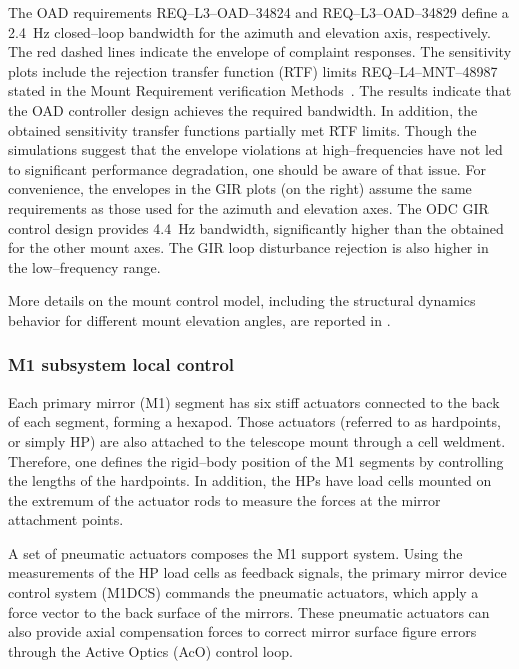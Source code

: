 \documentclass{gmto}
\begin{document}
The OAD requirements REQ--L3--OAD--34824 and REQ--L3--OAD--34829 define a \SI{2.4}{Hz} closed--loop bandwidth for the azimuth and elevation axis, respectively. The red dashed lines indicate the envelope of complaint responses. The sensitivity plots include the rejection transfer function (RTF) limits REQ--L4--MNT--48987 stated in the Mount Requirement verification Methods~\cite[Section 5.6.1]{GMT.DOC.02011}. The results indicate that the OAD controller design achieves the required bandwidth. In addition, the obtained sensitivity transfer functions partially met RTF limits. Though the simulations suggest that the envelope violations at high--frequencies have not led to significant performance degradation, one should be aware of that issue. For convenience, the envelopes in the GIR plots (on the right) assume the same requirements as those used for the azimuth and elevation axes. The ODC GIR control design provides \SI{4.4}{Hz} bandwidth, significantly higher than the obtained for the other mount axes. The GIR loop disturbance rejection is also higher in the low--frequency range.

More details on the mount control model, including the structural dynamics behavior for different mount elevation angles, are reported in \cite[Section 3]{ODC_end2end_2021}.


\subsubsection{M1 subsystem local control}
\label{sec:m1-ctrl}

Each primary mirror (M1) segment has six stiff actuators connected to the back of each segment, forming a hexapod. Those actuators (referred to as hardpoints, or simply HP) are also attached to the telescope mount through a cell weldment. Therefore, one defines the rigid--body position of the M1 segments by controlling the lengths of the hardpoints. In addition, the HPs have load cells mounted on the extremum of the actuator rods to measure the forces at the mirror attachment points.


A set of pneumatic actuators composes the M1 support system. Using the measurements of the HP load cells as feedback signals, the primary mirror device control system (M1DCS) commands the pneumatic actuators, which apply a force vector to the back surface of the mirrors. These pneumatic actuators can also provide axial compensation forces to correct mirror surface figure errors through the Active Optics (AcO) control loop.
\end{document}

